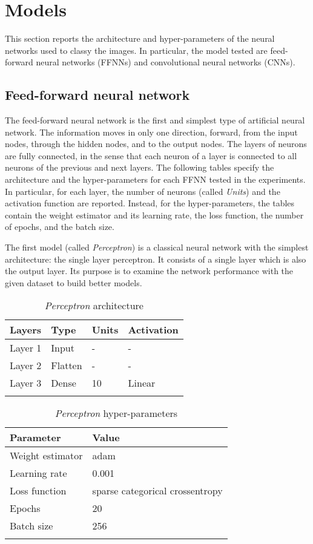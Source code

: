 \section{Models}\label{header-n90}

This section reports the architecture and hyper-parameters of the
neural networks used to classy the images. In particular, the model
tested are feed-forward neural networks (FFNNs) and convolutional neural
networks (CNNs).

\subsection{Feed-forward neural network}\label{header-n92}

The feed-forward neural network is the first and simplest type of
artificial neural network. The information moves in only one direction,
forward, from the input nodes, through the hidden nodes, and to the
output nodes. The layers of neurons are fully connected, in the sense
that each neuron of a layer is connected to all neurons of the previous
and next layers. The following tables specify the architecture and the
hyper-parameters for each FFNN tested in the experiments. In particular, for each layer, the
number of neurons (called \emph{Units}) and the activation function are
reported. Instead, for the hyper-parameters, the tables contain the
weight estimator and its learning rate, the loss function, the number of
epochs, and the batch size.

The first model (called \emph{Perceptron}) is a classical neural network
with the simplest architecture: the single layer perceptron. It consists
of a single layer which is also the output layer. Its purpose is to
examine the network performance with the given dataset to build better
models.

\begin{longtable}[]{@{}llll@{}}
	\toprule
	\textbf{Layers} & \textbf{Type} & \textbf{Units} & \textbf{Activation}\tabularnewline
	\midrule
	\endhead
	Layer 1 & Input & - & -\tabularnewline
	Layer 2 & Flatten & - & -\tabularnewline
	Layer 3 & Dense & 10 & Linear\tabularnewline
	\bottomrule
	\caption{\emph{Perceptron} architecture}
\end{longtable}

\begin{longtable}[]{@{}ll@{}}
	\toprule
	\textbf{Parameter} & \textbf{Value}\tabularnewline
	\midrule
	\endhead
	Weight estimator & adam\tabularnewline
	Learning rate & 0.001\tabularnewline
	Loss function & sparse categorical crossentropy\tabularnewline
	Epochs & 20\tabularnewline
	Batch size & 256\tabularnewline
	\bottomrule
	\caption{\emph{Perceptron} hyper-parameters}
\end{longtable}

